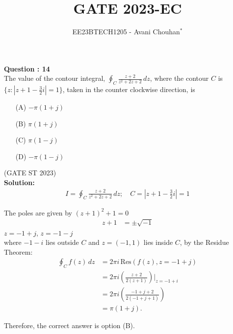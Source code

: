 \documentclass[journal,12pt,twocolumn]{IEEEtran}
\theoremstyle{remark}
\begin{document}

\vspace{3cm}

\title{GATE 2023-EC}
\author{EE23BTECH1205 - Avani Chouhan$^{*}$%
}
\maketitle
\newpage
\bigskip

\renewcommand{\thefigure}{\theenumi}
\renewcommand{\thetable}{\theenumi}

\vspace{3cm}
\textbf{Question : 14} \\
The value of the contour integral, $\oint_C \frac{z + 2}{z^2 + 2z + 2} \, dz$, where the contour $C$ is $\{ z : |z + 1 - \frac{3}{2}i| = 1 \}$, taken in the counter clockwise direction, is \\

\begin{enumerate}
  \item[(A)] $-\pi(1+j) $
  \item[(B)] $\pi(1+j)$
  \item[(C)] $\pi(1-j) $
  \item[(D)] $-\pi(1-j)$
\end{enumerate}

\hfill{(GATE ST 2023)}\\
\textbf{Solution:}
\fi
\begin{align}
I = \oint_{C} \frac{z + 2}{z^2 + 2z + 2} \, dz; \quad C = \left| z + 1 - \frac{3}{2}i \right| = 1 
\end{align}

The poles are given by $(z + 1)^2 + 1 = 0$\\
\begin{align}
    z + 1 &= \pm \sqrt{-1}
\end{align}
$z = -1 + j$, $z = -1 - j$\\
where $-1 - i$ lies outside $C$ and $z = (-1, 1)$ lies inside $C$, by the Residue Theorem:
\begin{align}
\oint_C f(z) \, dz &= 2\pi i \, \text{Res}(f(z), z=-1+j) \\
&= 2\pi i \left( \frac{z+2}{2(z+1)} \right) \bigg|_{z=-1+i} \\
&= 2\pi i \left( \frac {-1+j+2} {2(-1+j+1)} \right) \\
&= \pi (1+j).
\end{align}

Therefore, the correct answer is option (B).
\end{document}
